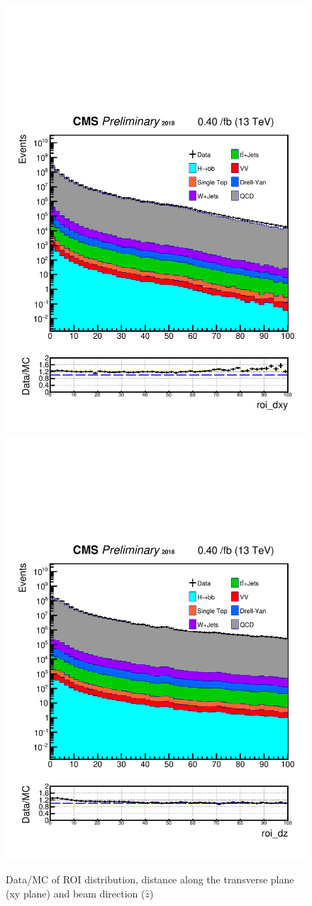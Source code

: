 \begin{figure}[h!]
	\caption{Data/MC of ROI distribution, distance along the transverse plane (xy plane) and beam direction ($\hat{z}$)}
  \label{fig:ROIs}
  \centering
  \includegraphics[width=0.47\linewidth]{figs/Data_AnalysisNoteplot_MS-15_ctauS-10_roi_dxy.pdf}
  \includegraphics[width=0.47\linewidth]{figs/Data_AnalysisNoteplot_MS-15_ctauS-10_roi_dz.pdf}
\end{figure}

